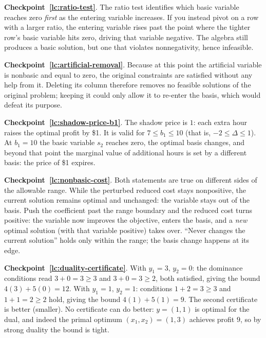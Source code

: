 \medskip

\noindent\textbf{Checkpoint~\ref{lc:ratio-test}}.
The ratio test identifies which basic variable reaches zero \emph{first} as the entering variable increases. If you instead pivot on a row with a larger ratio, the entering variable rises past the point where the tighter row's basic variable hits zero, driving that variable negative. The algebra still produces a basic solution, but one that violates nonnegativity, hence infeasible.

\medskip

\noindent\textbf{Checkpoint~\ref{lc:artificial-removal}}.
Because at this point the artificial variable is nonbasic and equal to zero, the original constraints are satisfied without any help from it. Deleting its column therefore removes no feasible solutions of the original problem; keeping it could only allow it to re-enter the basis, which would defeat its purpose.

\medskip

\noindent\textbf{Checkpoint~\ref{lc:shadow-price-b1}}.
The shadow price is $1$: each extra hour raises the optimal profit by \$1. It is valid for $7 \le b_1 \le 10$ (that is, $-2 \le \Delta \le 1$). At $b_1 = 10$ the basic variable $s_2$ reaches zero, the optimal basis changes, and beyond that point the marginal value of additional hours is set by a different basis: the price of \$1 expires.

\medskip

\noindent\textbf{Checkpoint~\ref{lc:nonbasic-cost}}.
Both statements are true on different sides of the allowable range. While the perturbed reduced cost stays nonpositive, the current solution remains optimal and unchanged: the variable stays out of the basis. Push the coefficient past the range boundary and the reduced cost turns positive: the variable now improves the objective, enters the basis, and a \emph{new} optimal solution (with that variable positive) takes over. ``Never changes the current solution'' holds only within the range; the basis change happens at its edge.

\medskip

\noindent\textbf{Checkpoint~\ref{lc:duality-certificate}}.
With $y_1 = 3,\, y_2 = 0$: the dominance conditions read $3 + 0 = 3 \geq 3$ and $3 + 0 = 3 \geq 2$, both satisfied, giving the bound $4(3) + 5(0) = 12$. With $y_1 = 1,\, y_2 = 1$: conditions $1 + 2 = 3 \geq 3$ and $1 + 1 = 2 \geq 2$ hold, giving the bound $4(1) + 5(1) = 9$. The second certificate is better (smaller). No certificate can do better: $y = (1,1)$ is optimal for the dual, and indeed the primal optimum $(x_1, x_2) = (1,3)$ achieves profit $9$, so by strong duality the bound is tight.

